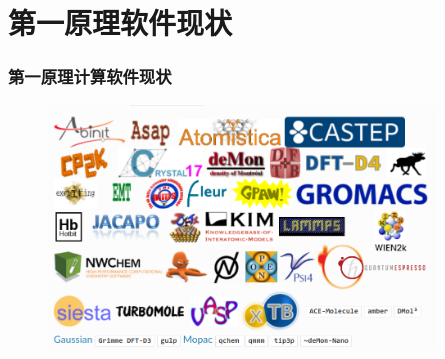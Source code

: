 \documentclass[cjk,slidestop,compress,mathserif,blue]{beamer}
\begin{document}

\subject{}
\frame
{
	\frametitle{\fontsize{9.5pt}{5.2pt}\selectfont{\textcolor{orange}{我国科学计算软件的现状、问题及对策研讨会}}}
\titlepage
}

\section*{}

\small
\section{第一原理软件现状}
\frame
{
	\frametitle{第一原理计算软件现状}
\begin{figure}[h!]
\vspace*{-0.18in}
\centering
\includegraphics[width=4.05in]{Figures/Softwares_logo.png}
\label{Softwares}
\end{figure}
}
\end{document}
